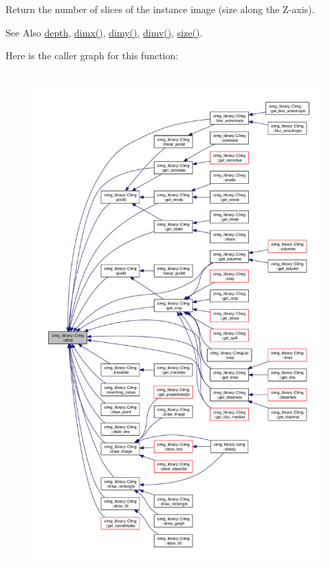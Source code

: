 Return the number of slices of the instance image (size along the Z-\/axis). 

\begin{DoxySeeAlso}{See Also}
\hyperlink{structcimg__library_1_1_c_img_a982d5d1e153477adf7f851106fe8ee3a}{depth}, \hyperlink{structcimg__library_1_1_c_img_abf1a3c383880a20428b2ea9d22f3c06e}{dimx()}, \hyperlink{structcimg__library_1_1_c_img_aa1e128f9d950b39ed312eb368741970c}{dimy()}, \hyperlink{structcimg__library_1_1_c_img_ad30f8300f32a94a80e1e06c84a45de49}{dimv()}, \hyperlink{structcimg__library_1_1_c_img_a4f22f4188289724c853ed6a12b0a2e1e}{size()}. 
\end{DoxySeeAlso}


Here is the caller graph for this function\-:
\nopagebreak
\begin{figure}[H]
\begin{center}
\leavevmode
\includegraphics[height=550pt]{structcimg__library_1_1_c_img_aba56e96a615d71ed9a71009768fc4b75_icgraph}
\end{center}
\end{figure}


